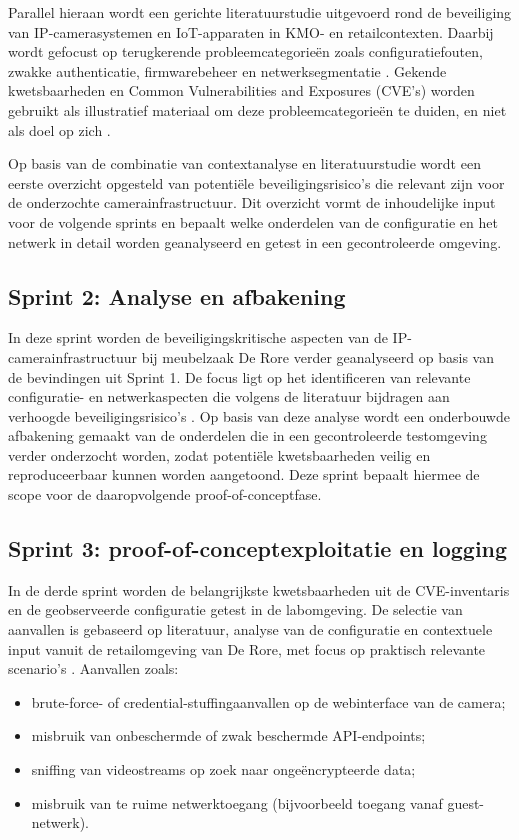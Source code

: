 Parallel hieraan wordt een gerichte literatuurstudie uitgevoerd rond de beveiliging van \newline IP-camerasystemen en IoT-apparaten in KMO- en retailcontexten. Daarbij wordt gefocust op terugkerende probleemcategorieën zoals configuratiefouten, zwakke authenticatie, firmwarebeheer en netwerksegmentatie \parencite{Butun2019}. Gekende kwetsbaarheden en Common Vulnerabilities and Exposures (CVE’s) worden gebruikt als illustratief materiaal om deze probleemcategorieën te duiden, en niet als doel op zich \parencite{CVEdb}.

Op basis van de combinatie van contextanalyse en literatuurstudie wordt een eerste overzicht opgesteld van potentiële beveiligingsrisico’s die relevant zijn voor de onderzochte camerainfrastructuur. Dit overzicht vormt de inhoudelijke input voor de volgende sprints en bepaalt welke onderdelen van de configuratie en het netwerk in detail worden geanalyseerd en getest in een gecontroleerde omgeving.

\subsection*{Sprint 2: Analyse en afbakening}
In deze sprint worden de beveiligingskritische aspecten van de IP-camerainfrastructuur bij meubelzaak De Rore verder geanalyseerd op basis van de bevindingen uit Sprint 1. De focus ligt op het identificeren van relevante configuratie- en netwerkaspecten die volgens de literatuur bijdragen aan verhoogde beveiligingsrisico’s \parencite{Butun2019}. Op basis van deze analyse wordt een onderbouwde afbakening gemaakt van de onderdelen die in een gecontroleerde testomgeving verder onderzocht worden, zodat potentiële kwetsbaarheden veilig en reproduceerbaar kunnen worden aangetoond. Deze sprint bepaalt hiermee de scope voor de daaropvolgende proof-of-conceptfase.

\subsection*{Sprint 3: proof-of-conceptexploitatie en logging}

In de derde sprint worden de belangrijkste kwetsbaarheden uit de CVE-inventaris en de geobserveerde configuratie getest in de labomgeving. De selectie van aanvallen is gebaseerd op literatuur, analyse van de configuratie en contextuele input vanuit de retailomgeving van De Rore, met focus op praktisch relevante scenario’s \parencite{Butun2019}. Aanvallen zoals:
\begin{itemize}
    \item brute-force- of credential-stuffingaanvallen op de webinterface van de camera;
    \item misbruik van onbeschermde of zwak beschermde API-endpoints;
    \item sniffing van videostreams op zoek naar ongeëncrypteerde data;
    \item misbruik van te ruime netwerktoegang (bijvoorbeeld toegang vanaf guest-netwerk).
\end{itemize}


